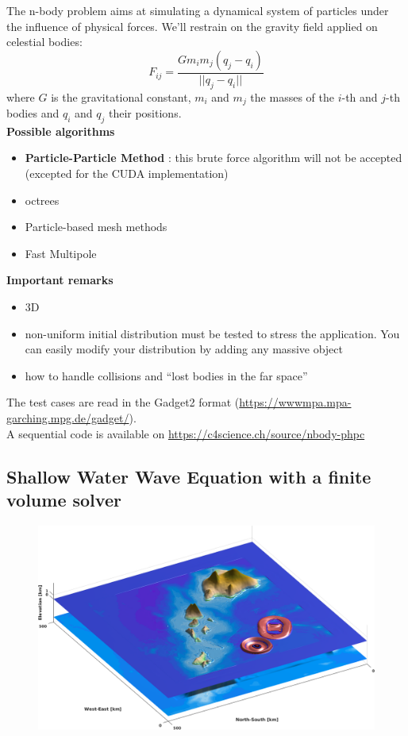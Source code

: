 \documentclass[10pt]{article}
\begin{document}
The n-body problem aims at simulating a dynamical system of particles under the influence of physical forces. We'll restrain on the gravity field applied on celestial bodies:
$$
F_{ij} = \frac{G m_i m_j (q_j - q_i)}{||q_j - q_i||}
$$
where $G$ is the gravitational constant, $m_i$ and $m_j$ the masses of the $i$-th and $j$-th bodies and $q_i$ and $q_j$ their positions.
\\

\textbf{Possible algorithms}
\\

\begin{itemize}
	\item{\textbf{Particle-Particle Method} : this brute force algorithm will not be accepted (excepted for the CUDA implementation)}
	\item{octrees}
	\item{Particle-based mesh methods}
	\item{Fast Multipole}
\end{itemize}



\textbf{Important remarks}
\\

\begin{itemize}
	\item{3D}
	\item{non-uniform initial distribution must be tested to stress the application. You can easily modify your distribution by adding any massive object}
	\item{how to handle collisions and ``lost bodies in the far space''}
\end{itemize}

The test cases are read in the Gadget2 format (\url{https://wwwmpa.mpa-garching.mpg.de/gadget/}). 
\\

A sequential code is available on \url{https://c4science.ch/source/nbody-phpc}


\subsection{Shallow Water Wave Equation with a finite volume solver}

\begin{figure}[H]
\center

\includegraphics[width=118mm]{tsunami}
\end{figure}
\end{document}

